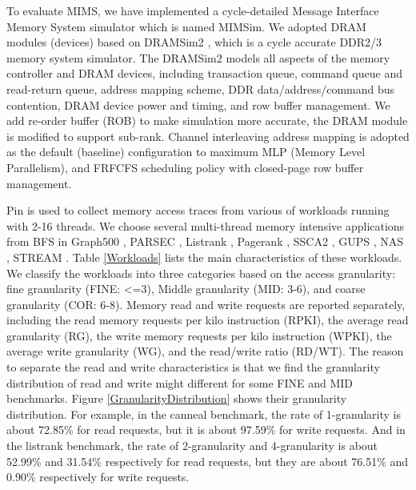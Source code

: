 \documentclass[pageno]{jpaper}
\begin{document}
To evaluate MIMS, we have implemented a cycle-detailed Message Interface Memory System simulator which is named MIMSim. We adopted DRAM modules (devices) based on DRAMSim2 \cite{DRAMSim2}, which is a cycle accurate DDR2/3 memory system simulator. The DRAMSim2 models all aspects of the memory controller and DRAM devices, including transaction queue, command queue and read-return queue, address mapping scheme, DDR data/address/command bus contention, DRAM device power and timing, and row buffer management. We add re-order buffer (ROB) to make simulation more accurate, the DRAM module is modified to support sub-rank. Channel interleaving address mapping is adopted as the default (baseline) configuration to maximum MLP (Memory Level Parallelism), and FRFCFS \cite{FRFCFSScheduling} scheduling policy with closed-page row buffer management.


Pin \cite{Pin} is used to collect memory access traces from various of workloads running with 2-16 threads. We choose several multi-thread memory intensive applications from BFS in Graph500 \cite{Graph500}, PARSEC \cite{PARSEC}, Listrank \cite{ListRank}, Pagerank \cite{PageRank}, SSCA2 \cite{SSCA2}, GUPS \cite{GUPS}, NAS \cite{NAS}, STREAM \cite{STREAM}. Table \ref{Workloads} lists the main characteristics of these workloads. We classify the workloads into three categories based on the access granularity: fine granularity (FINE: <=3), Middle granularity (MID: 3-6), and coarse granularity (COR: 6-8). Memory read  and write requests are reported separately, including the read memory requests per kilo instruction (RPKI), the average read granularity (RG), the write memory requests per kilo instruction (WPKI), the average write granularity (WG), and the read/write ratio (RD/WT). The reason to separate the read and write characteristics is that we find the granularity distribution of read and write might different for some FINE and MID benchmarks. Figure \ref{GranularityDistribution} shows their granularity distribution. For example, in the canneal benchmark, the rate of 1-granularity is about 72.85\% for read requests, but it is about 97.59\% for write requests. And in the listrank benchmark, the rate of 2-granularity and 4-granularity is about 52.99\% and 31.54\% respectively for read requests, but they are about 76.51\% and 0.90\% respectively for write requests.
\end{document}
